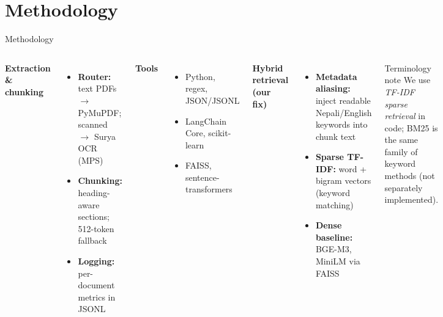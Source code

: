 \documentclass[11pt,aspectratio=169]{beamer}
\begin{document}
\section{Methodology}
\begin{frame}{Methodology}
  \begin{columns}[T]
    \textbf{Extraction \& chunking}
    \begin{itemize}
      \item \textbf{Router:} text PDFs $\rightarrow$ PyMuPDF; scanned $\rightarrow$ Surya OCR (MPS)
      \item \textbf{Chunking:} heading-aware sections; 512-token fallback
      \item \textbf{Logging:} per-document metrics in JSONL
    \end{itemize}
    \textbf{Tools}
    \begin{itemize}
      \item Python, regex, JSON/JSONL
      \item LangChain Core, scikit-learn
      \item FAISS, sentence-transformers
    \end{itemize}
    \textbf{Hybrid retrieval (our fix)}
    \begin{itemize}
      \item \textbf{Metadata aliasing:} inject readable Nepali/English keywords into chunk text
      \item \textbf{Sparse TF-IDF:} word + bigram vectors (keyword matching)
      \item \textbf{Dense baseline:} BGE-M3, MiniLM via FAISS
    \end{itemize}
    \vspace{0.2cm}
    \begin{block}{Terminology note}
      We use \emph{TF-IDF sparse retrieval} in code; BM25 is the same family of keyword methods (not separately implemented).
    \end{block}
  \end{columns}
\end{frame}

\end{document}

